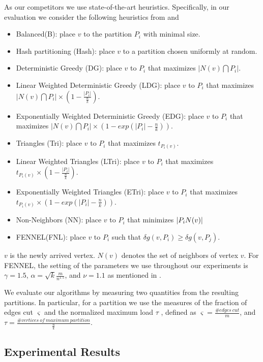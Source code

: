\documentclass{sig-alternate-2013}
\begin{document}
As our competitors we use state-of-the-art heuristics.
Specifically, in our evaluation we consider the following heuristics from \cite{Stanton:streampartition} and \cite{Charalampos:fennel}
\begin{itemize}
  \item Balanced(B): place $v$ to the partition $P_i$ with minimal size.
  \item Hash partitioning (Hash): place $v$ to a partition chosen uniformly at random.
  \item Deterministic Greedy (DG): place $v$ to $P_i$ that maximizes $|N(v)\bigcap P_i|$.
  \item Linear Weighted Deterministic Greedy (LDG): place $v$ to $P_i$ that maximizes $|N(v)\bigcap P_i|\times (1-\frac{|P_i|}{\frac{n}{k}})$.
  \item Exponentially Weighted Deterministic Greedy (EDG): place $v$ to $P_i$ that maximizes $|N(v)\bigcap P_i|\times (1-exp(|P_i|-\frac{n}{k}))$.
  \item Triangles (Tri): place $v$ to $P_i$ that maximizes $t_{P_i(v)}$.
  \item Linear Weighted Triangles (LTri): place $v$ to $P_i$ that maximizes $t_{P_i(v)}\times (1-\frac{|P_i|}{\frac{n}{k}})$.
  \item Exponentially Weighted Triangles (ETri): place $v$ to $P_i$ that maximizes $t_{P_i(v)}\times (1-exp(|P_i|-\frac{n}{k}))$.
  \item Non-Neighbors (NN): place $v$ to $P_i$ that minimizes $|P_i\\N(v)|$
  \item FENNEL(FNL): place $v$ to $P_i$ such that $\delta g(v, P_i)\geq \delta g(v, P_j)$.
\end{itemize}
$v$ is the newly arrived vertex. $N(v)$ denotes the set of neighbors of vertex $v$. For FENNEL, the setting of the parameters we use throughout our experiments is $\gamma=1.5$, $ \alpha=\sqrt{k}\frac{m}{n^{1.5}}$, and $\nu = 1.1$ as mentioned in \cite{Charalampos:fennel}.

We evaluate our algorithms by measuring two quantities from the resulting partitions.
In particular, for a partition we use the measures of the fraction of edges cut $\varsigma$
and the normalized maximum load $\tau$ \cite{Charalampos:fennel}, defined as
$\varsigma = \frac{\# edges\ cut}{m}$, and $\tau = \frac{\# vertices\ of\ maximum\ partition}{\frac{n}{k}}$.



\subsection{Experimental Results}\label{ch_experiment_result}
\end{document}
